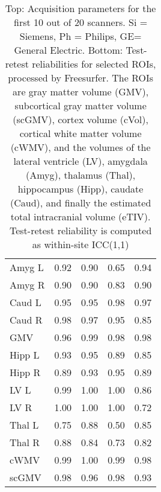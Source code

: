 \begin{table}
\begin{tabular}{lllll}
\midrule
Amyg L                &               0.92 &               0.90 &                 0.65 &                 0.94 \\
Amyg R                &               0.90 &               0.90 &                 0.83 &                 0.90 \\
Caud L                &               0.95 &               0.95 &                 0.98 &                 0.97 \\
Caud R                &               0.98 &               0.97 &                 0.95 &                 0.85 \\
GMV                   &               0.96 &               0.99 &                 0.98 &                 0.98 \\
Hipp L                &               0.93 &               0.95 &                 0.89 &                 0.85 \\
Hipp R                &               0.89 &               0.93 &                 0.95 &                 0.89 \\
LV L                  &               0.99 &               1.00 &                 1.00 &                 0.86 \\
LV R                  &               1.00 &               1.00 &                 1.00 &                 0.72 \\
Thal L                &               0.75 &               0.88 &                 0.50 &                 0.85 \\
Thal R                &               0.88 &               0.84 &                 0.73 &                 0.82 \\
cWMV                  &               0.99 &               1.00 &                 0.99 &                 0.98 \\
scGMV                 &               0.98 &               0.96 &                 0.98 &                 0.93 \\
\bottomrule
\end{tabular}
\caption{Top: Acquisition parameters for the first 10 out of 20 scanners. Si = Siemens, Ph = Philips, GE= General Electric. Bottom: Test-retest reliabilities for selected ROIs, processed by Freesurfer. The ROIs are gray matter volume (GMV), subcortical gray matter volume (scGMV), cortex volume (cVol), cortical white matter volume (cWMV), and the volumes of the lateral ventricle (LV), amygdala (Amyg), thalamus (Thal), hippocampus (Hipp), caudate (Caud), and finally the estimated total intracranial volume (eTIV). Test-retest reliability is computed as within-site ICC(1,1)} 
\label{tab:acquisition1}

\end{table}